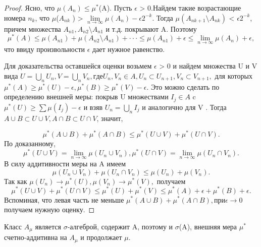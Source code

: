 \begin{proof}
Ясно, что $\mu(A_n) \leq \mu^*$(A). Пусть $\epsilon$ > 0.Найдем такие возрастающие номера $n_k$, что $\mu$($A_{nk}$ ) > $\lim\limits_{n\to \infty} \mu(A_n) - \epsilon 2^{-k}$. 
Тогда $\mu(A_{nk+1}\setminus A_{nk})$ < $\epsilon 2^{-k}$, причем множества $A_{n1}, A_{n2}\setminus A_{n1}$ и т.д. покрывают A. Поэтому
$$\mu^*(A)\leq\mu(A_{n1})+\mu(A_{n2}\setminus A_{n1})+···\leq \mu(A_{n1})+\epsilon \leq \lim\limits_{n\to \infty} \mu(A_n)+\epsilon, $$
что ввиду произвольности $\epsilon$ дает нужное равенство.

Для доказательства оставшейся оценки возьмем $\epsilon$ > 0 и найдем
множества U и V вида $ U = \bigcup_n U_n, V = \bigcup_n V_n, где U_n,V_n \in A, U_n \subset U_{n+1}, V_n \subset V_{n+1},$ для которых $\mu^*(A) \geq \mu^*(U) - \epsilon, \mu^*(B) \geq \mu^*(V ) - \epsilon.$ Это можно сделать по определению внешней меры: покрыв U множествами $I_j \in A $ c $ \mu^*(U) \geq \sum \mu(I_j) - \epsilon$ и взяв $U_n = \bigcup_n I_j$ и аналогично для V . Тогда $A \cup B \subset U \cup V , A \cap B \subset U \cap V $, значит,

$$\mu^*(A \cup B) + \mu^*(A \cap B) \leq \mu^*(U \cup V ) + \mu^*(U \cap V ).$$
По доказанному,
$$\mu^*(U\cup V)= \lim\limits_{n\to \infty} \mu(U_n\cup V_n), \mu^*(U\cap V)= \lim\limits_{n\to \infty} \mu(U_n\cap V_n).$$
В силу аддитивности меры на A имеем
$$\mu(U_n \cup V_n) + \mu(U_n \cap V_n) \leq \mu(U_n) + \mu(V_n).$$
Так как $\mu(U_n) \rightarrow \mu^*(U), \mu(V_n) \rightarrow \mu^*(V ),$ получаем
$$\mu^*(U \cup V ) + \mu^*(U \cap V ) \leq \mu^*(U) + \mu^*(V ) \leq \mu^*(A) + \epsilon + \mu^*(B) + \epsilon.$$
Вспоминая, что левая часть не меньше $\mu^*(A\cup B)+\mu^*(A\cap B), при \epsilon \rightarrow 0$ получаем нужную оценку. 
\end{proof}

\begin{theorem} Класс $A_\mu$ является $\sigma$-алгеброй, содержит A, поэтому и $\sigma$(A), внешняя мера $\mu^*$ счетно-аддитивна на $A_\mu$ и продолжает $\mu$.
\end{theorem}

